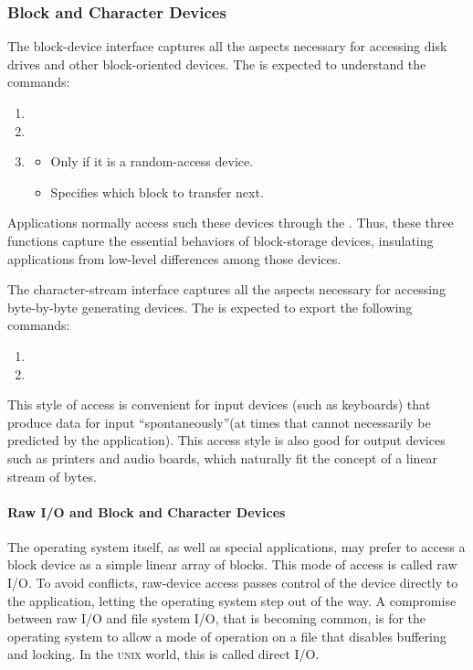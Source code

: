 \subsubsection{Block and Character Devices}\label{subsubsec:Block_Char_Devices}
The block-device interface captures all the aspects necessary for accessing disk drives and other block-oriented devices.
The  is expected to understand the commands:
\begin{enumerate}[noitemsep]
\item {}
\item {}
\item {}
  \begin{itemize}[noitemsep]
  \item Only if it is a random-access device.
  \item Specifies which block to transfer next.
  \end{itemize}
\end{enumerate}

Applications normally access such these devices through the .
Thus, these three functions capture the essential behaviors of block-storage devices, insulating applications from low-level differences among those devices.

The character-stream interface captures all the aspects necessary for accessing byte-by-byte generating devices.
The  is expected to export the following commands:
\begin{enumerate}[noitemsep]
\item {}
\item {}
\end{enumerate}

This style of access is convenient for input devices (such as keyboards) that produce data for input ``spontaneously''(at times that cannot necessarily be predicted by the application).
This access style is also good for output devices such as printers and audio boards, which naturally fit the concept of a linear stream of bytes.

\paragraph{Raw I/O and Block and Character Devices}\label{par:Raw_IO_Block_Char_Devices}
The operating system itself, as well as special applications, may prefer to access a block device as a simple linear array of blocks.
This mode of access is called raw I/O.
To avoid conflicts, raw-device access passes control of the device directly to the application, letting the operating system step out of the way.
A compromise between raw I/O and file system I/O, that is becoming common, is for the operating system to allow a mode of operation on a file that disables buffering and locking.
In the \textsc{unix} world, this is called direct I/O.

